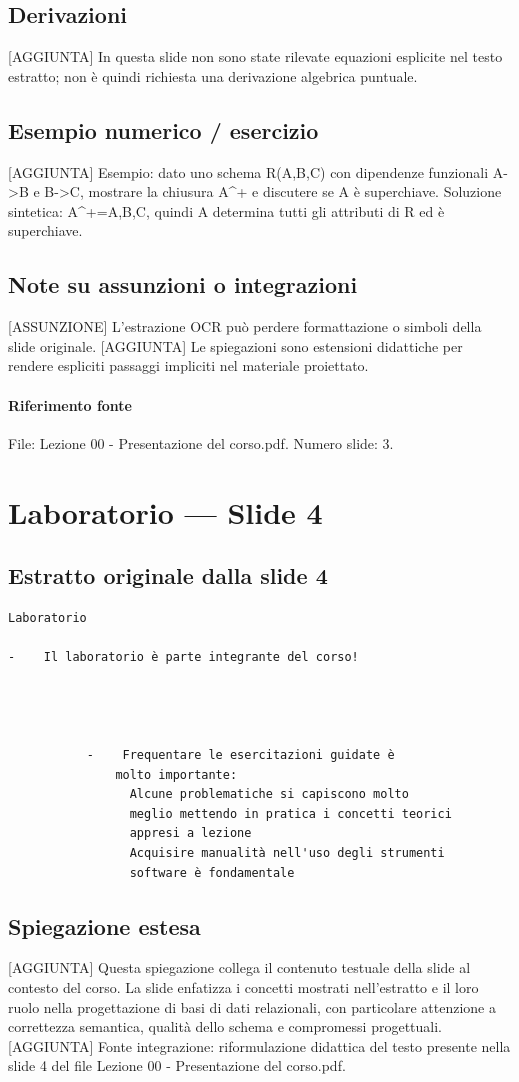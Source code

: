 \documentclass[11pt]{article}
\begin{document}
\subsection*{Derivazioni}
[AGGIUNTA] In questa slide non sono state rilevate equazioni esplicite nel testo estratto; non è quindi richiesta una derivazione algebrica puntuale.
\subsection*{Esempio numerico / esercizio}
[AGGIUNTA] Esempio: dato uno schema R(A,B,C) con dipendenze funzionali A->B e B->C, mostrare la chiusura A^+ e discutere se A è superchiave. Soluzione sintetica: A^+={A,B,C}, quindi A determina tutti gli attributi di R ed è superchiave.
\subsection*{Note su assunzioni o integrazioni}
[ASSUNZIONE] L'estrazione OCR può perdere formattazione o simboli della slide originale.
[AGGIUNTA] Le spiegazioni sono estensioni didattiche per rendere espliciti passaggi impliciti nel materiale proiettato.
\paragraph{Riferimento fonte} File: Lezione 00 - Presentazione del corso.pdf. Numero slide: 3.
\section{Laboratorio --- Slide 4}
\subsection*{Estratto originale dalla slide 4}
\begin{lstlisting}
Laboratorio

-    Il laboratorio è parte integrante del corso!




           -    Frequentare le esercitazioni guidate è
               molto importante:
                 Alcune problematiche si capiscono molto
                 meglio mettendo in pratica i concetti teorici
                 appresi a lezione
                 Acquisire manualità nell'uso degli strumenti
                 software è fondamentale
\end{lstlisting}
\subsection*{Spiegazione estesa}
[AGGIUNTA] Questa spiegazione collega il contenuto testuale della slide al contesto del corso. La slide enfatizza i concetti mostrati nell'estratto e il loro ruolo nella progettazione di basi di dati relazionali, con particolare attenzione a correttezza semantica, qualità dello schema e compromessi progettuali.
[AGGIUNTA] Fonte integrazione: riformulazione didattica del testo presente nella slide 4 del file Lezione 00 - Presentazione del corso.pdf.
\end{document}
